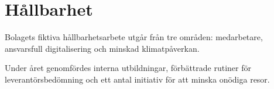 \section{Hållbarhet}

Bolagets fiktiva hållbarhetsarbete utgår från tre områden: medarbetare,
ansvarsfull digitalisering och minskad klimatpåverkan.

Under året genomfördes interna utbildningar, förbättrade rutiner för
leverantörsbedömning och ett antal initiativ för att minska onödiga resor.
